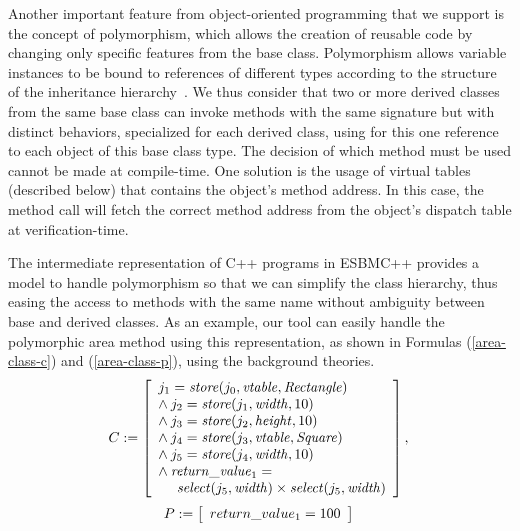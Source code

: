 \documentclass[conference]{IEEEtran}
\begin{document}
Another important feature from object-oriented programming that we
support is the concept of polymorphism, which allows the creation of
reusable code by changing only specific features from the base class.
Polymorphism allows variable instances to be
bound to references of different types according to the structure of the
inheritance hierarchy~\cite{Alexander02}.
We thus consider that two or more derived classes
from the same base class can invoke methods with the same signature but
with distinct behaviors, specialized for each derived class, using for
this one reference to each object of this base class type. The decision
of which method must be used cannot be made at compile-time.
One solution is the usage of virtual tables (described below) that contains
the object's method address. In this case, the method call will fetch the correct method
address from the object's dispatch table at verification-time.



The intermediate representation of C++ programs in ESBMC++ provides a model
to handle polymorphism so that we can simplify the class hierarchy,
thus easing the access to methods with the same name without ambiguity between
base and derived classes. As an example, our tool can easily handle the polymorphic
area method using this representation, as shown in Formulas (\ref{area-class-c}) and
(\ref{area-class-p}), using the background theories.
%
\begin{equation}
\label{area-class-c}
C := \left [ \begin{array}{ll}
        j_{1} = \mathit{store}(j_{0}, \mathit{vtable}, \mathit{Rectangle}) \\
        \wedge\: j_{2} = \mathit{store}(j_{1}, \mathit{width}, 10) \\
        \wedge\: j_{3} = \mathit{store}(j_{2}, \mathit{height}, 10) \\
        \wedge\: j_{4} = \mathit{store}(j_{3}, \mathit{vtable}, \mathit{Square}) \\
        \wedge\: j_{5} = \mathit{store}(j_{4}, \mathit{width}, 10) \\
        \wedge\: \mathit{return\_value}_{1} = \\
        \:\:\:\:\:\:\mathit{select}(j_{5}, \mathit{width}) \times
                    \mathit{select}(j_{5}, \mathit{width}) \\
              \end{array} \right ],  \\
\end{equation}
%
\begin{equation}
\label{area-class-p}
P := \left [ \begin{array}{ll}
              return\_value_{1} = 100 \\
              \end{array} \right ]  \\
\end{equation}
%
\end{document}
